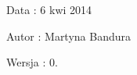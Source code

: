 \begin{DoxyDate}{\-Data}
\-: 6 kwi 2014 
\end{DoxyDate}
\begin{DoxyAuthor}{\-Autor}
\-: \-Martyna \-Bandura 
\end{DoxyAuthor}
\begin{DoxyVersion}{\-Wersja}
\-: 0. 
\end{DoxyVersion}
